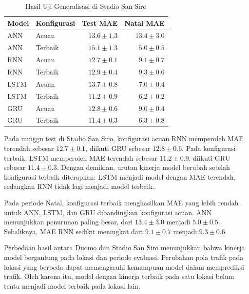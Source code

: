 \documentclass[conference,a4paper]{IEEEtran}
\begin{document}
\begin{table}[!t]
    \centering
    \caption{Hasil Uji Generalisasi di Stadio San Siro}
    \label{tab:generalisasi}
    \footnotesize
    \begin{tabular}{llrr}
        \toprule
        Model & Konfigurasi & Test MAE & Natal MAE \\
        \midrule
        ANN & Acuan
        & $13.6 \pm 1.3$ & $13.4 \pm 3.0$ \\
        ANN & Terbaik
        & $15.1 \pm 1.3$ & $5.0 \pm 0.5$ \\
        \midrule
        RNN & Acuan
        & $12.7 \pm 0.1$ & $9.1 \pm 0.7$ \\
        RNN & Terbaik
        & $12.9 \pm 0.4$ & $9.3 \pm 0.6$ \\
        \midrule
        LSTM & Acuan
        & $13.7 \pm 0.8$ & $7.0 \pm 0.4$ \\
        LSTM & Terbaik
        & $11.2 \pm 0.9$ & $6.2 \pm 0.2$ \\
        \midrule
        GRU & Acuan
        & $12.8 \pm 0.6$ & $9.0 \pm 0.4$ \\
        GRU & Terbaik
        & $11.4 \pm 0.3$ & $6.3 \pm 0.8$ \\
        \bottomrule
    \end{tabular}
\end{table}

Pada minggu test di Stadio San Siro, konfigurasi acuan RNN
memperoleh MAE terendah sebesar $12.7 \pm 0.1$, diikuti
GRU sebesar $12.8 \pm 0.6$. Pada konfigurasi terbaik,
LSTM memperoleh MAE terendah sebesar $11.2 \pm 0.9$,
diikuti GRU sebesar $11.4 \pm 0.3$. Dengan demikian,
urutan kinerja model berubah setelah konfigurasi terbaik
diterapkan: LSTM menjadi model dengan MAE terendah,
sedangkan RNN tidak lagi menjadi model terbaik.

Pada periode Natal, konfigurasi terbaik menghasilkan MAE
yang lebih rendah untuk ANN, LSTM, dan GRU dibandingkan
konfigurasi acuan. ANN menunjukkan penurunan paling besar,
dari $13.4 \pm 3.0$ menjadi $5.0 \pm 0.5$. Sebaliknya,
MAE RNN sedikit meningkat dari $9.1 \pm 0.7$ menjadi
$9.3 \pm 0.6$.

Perbedaan hasil antara Duomo dan Stadio San Siro menunjukkan
bahwa kinerja model bergantung pada lokasi dan periode
evaluasi. Perubahan pola trafik pada lokasi yang berbeda
dapat memengaruhi kemampuan model dalam memprediksi trafik.
Oleh karena itu, model dengan kinerja terbaik pada satu
lokasi belum tentu menjadi model terbaik pada lokasi lain.
\end{document}
